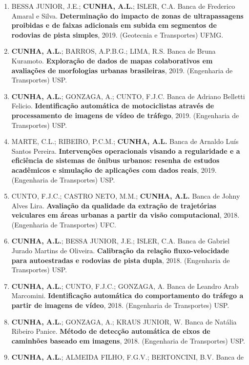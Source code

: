 \documentclass[
  brazilian,
  11pt,
  a4paper,
]{article}
\begin{document}
\begin{enumerate}
  \textbf{CUNHA, A.L.}; LIMA, R.S.; ALMEIDA FILHO, F.G.V. Banca de André
  Borgato Morelli. \textbf{Análise exploratória de resiliência em redes
  viárias urbanas}, 2019. (Engenharia de Transportes) USP.
\item
  BESSA JUNIOR, J.E.; \textbf{CUNHA, A.L.}; ISLER, C.A. Banca de
  Frederico Amaral e Silva. \textbf{Determinação do impacto de zonas de
  ultrapassagens proibidas e de faixas adicionais em subida em segmentos
  de rodovias de pista simples}, 2019. (Geotecnia e Transportes) UFMG.
\item
  \textbf{CUNHA, A.L.}; BARROS, A.P.B.G.; LIMA, R.S. Banca de Bruna
  Kuramoto. \textbf{Exploração de dados de mapas colaborativos em
  avaliações de morfologias urbanas brasileiras}, 2019. (Engenharia de
  Transportes) USP.
\item
  \textbf{CUNHA, A.L.}; GONZAGA, A.; CUNTO, F.J.C. Banca de Adriano
  Belletti Felicio. \textbf{Identificação automática de motociclistas
  através de processamento de imagens de vídeo de tráfego}, 2019.
  (Engenharia de Transportes) USP.
\item
  MARTE, C.L.; RIBEIRO, P.C.M.; \textbf{CUNHA, A.L.} Banca de Arnaldo
  Luís Santos Pereira. \textbf{Intervenções operacionais visando a
  regularidade e a eficiência de sistemas de ônibus urbanos: resenha de
  estudos acadêmicos e simulação de aplicações com dados reais}, 2019.
  (Engenharia de Transportes) USP.
\item
  CUNTO, F.J.C.; CASTRO NETO, M.M.; \textbf{CUNHA, A.L.} Banca de Johny
  Alves Lira. \textbf{Avaliação da qualidade da extração de trajetórias
  veiculares em áreas urbanas a partir da visão computacional}, 2018.
  (Engenharia de Transportes) UFC.
\item
  \textbf{CUNHA, A.L.}; BESSA JUNIOR, J.E.; ISLER, C.A. Banca de Gabriel
  Jurado Martins de Oliveira. \textbf{Calibração da relação
  fluxo-velocidade para autoestradas e rodovias de pista dupla}, 2018.
  (Engenharia de Transportes) USP.
\item
  \textbf{CUNHA, A.L.}; CUNTO, F.J.C.; GONZAGA, A. Banca de Leandro Arab
  Marcomini. \textbf{Identificação automática do comportamento do
  tráfego a partir de imagens de vídeo}, 2018. (Engenharia de
  Transportes) USP.
\item
  \textbf{CUNHA, A.L.}; GONZAGA, A.; KRAUS JUNIOR, W. Banca de Natália
  Ribeiro Panice. \textbf{Método de detecção automática de eixos de
  caminhões baseado em imagens}, 2018. (Engenharia de Transportes) USP.
\item
  \textbf{CUNHA, A.L.}; ALMEIDA FILHO, F.G.V.; BERTONCINI, B.V. Banca de

\end{enumerate}
\end{document}
